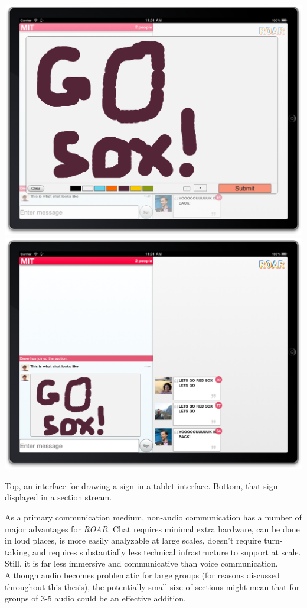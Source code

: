 \begin{marginfigure}
	\includegraphics{figures/roar/drawing_sign}
	\includegraphics{figures/roar/sign_in_section_chat.png}
	\caption{Top, an interface for drawing a sign in a tablet interface. Bottom, that sign displayed in a section stream.}
	\label{fig:roar_sign}
\end{marginfigure}


As a primary communication medium, non-audio communication has a number of major advantages for \emph{ROAR}. Chat requires minimal extra hardware, can be done in loud places, is more easily analyzable at large scales, doesn't require turn-taking, and requires substantially less technical infrastructure to support at scale. Still, it is far less immersive and communicative than voice communication. Although audio becomes problematic for large groups (for reasons discussed throughout this thesis), the potentially small size of sections might mean that for groups of 3-5 audio could be an effective addition.

